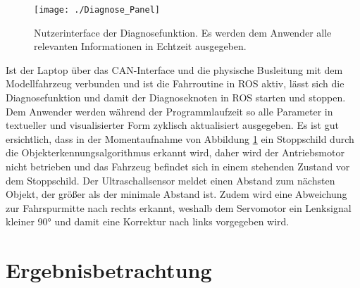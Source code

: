\begin{figure}[!hbt]
	\centering
	\texttt{[image: ./Diagnose\_Panel]}
	\caption{Nutzerinterface der Diagnosefunktion. Es werden dem Anwender alle relevanten Informationen in Echtzeit ausgegeben.}
	\label{abb:DiagnosePanel}
\end{figure} 

Ist der Laptop über das CAN-Interface und die physische Busleitung mit dem Modellfahrzeug verbunden und ist die Fahrroutine in ROS aktiv, lässt sich die Diagnosefunktion und damit der Diagnoseknoten in ROS starten und stoppen. Dem Anwender werden während der Programmlaufzeit so alle Parameter in textueller und visualisierter Form zyklisch aktualisiert ausgegeben. Es ist gut ersichtlich, dass in der Momentaufnahme von Abbildung \ref{abb:DiagnosePanel} ein Stoppschild durch die Objekterkennungsalgorithmus erkannt wird, daher wird der Antriebsmotor nicht betrieben und das Fahrzeug befindet sich in einem stehenden Zustand vor dem Stoppschild. Der Ultraschallsensor meldet einen Abstand zum nächsten Objekt, der größer als der minimale Abstand ist. Zudem wird eine Abweichung zur Fahrspurmitte nach rechts erkannt, weshalb dem Servomotor ein Lenksignal kleiner 90° und damit eine Korrektur nach links vorgegeben wird.

\begin{comment}
	Dummy-Botschaften über Python, ...
	Skriptsprache Python
	Package python-can
	Einbindung in ROS --> neuer Knoten
	Abonnieren sämtlicher Knoten
	Besonderheit callback-Funktion
	Deabonnieren, wenn Diagnose passiv ist
	Programmablaufplan
	Datentypen: Variablen in char Arrays wandeln
	IEEE Umrechnung von float-Variablen
	Empfänger: 	Datenbasis als dbc.File
	Visualisierung in Diagnose-Panel
	Timing (eher in kritische Betrachtung, globales Timing angepasst)
	
	\begin{figure}[!htbp]
	\centering
	\texttt{[image: ./Diagnose-Kommunikationsprinzip]}
	\caption{ASAM/ISO-Diagnose-Server-Prinzip (Kommunikationsprinzip) [Reif]}
	\label{abb:DiagnoseKommunkationsprinzip}
	\end{figure}
	
\end{comment}



\section{Ergebnisbetrachtung} \label{sec:ErgebnisDiagnose}

